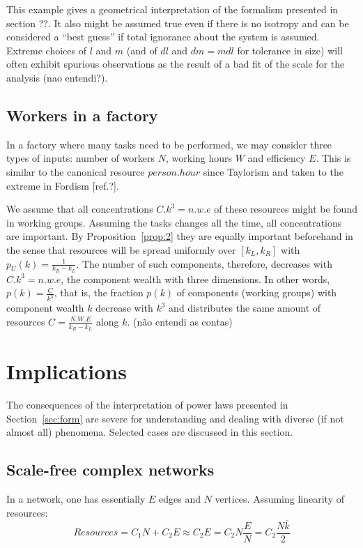 \documentclass[a4paper, 11pt]{article} %
\begin{document}
This example gives a geometrical interpretation of the formalism presented in section ??. It also might be assumed true even if there is no isotropy and can be considered a ``best guess'' if total ignorance
about the system is assumed. Extreme choices of $l$ and $m$ (and of $dl$ and $dm=mdl$ for tolerance in size) will often exhibit spurious observations as the result of a bad fit of the scale for the analysis (nao entendi?).

\subsection{Workers in a factory}
In a factory where many tasks need to be performed, we may consider three types of inputs: number of workers $N$, working hours $W$
and efficiency $E$. This is similar to the canonical resource  
$person.hour$ since Taylorism and taken to the extreme in Fordism [ref.?].

We assume that all concentrations $C.k^3=n.w.e$
of these resources might be found in working groups.
Assuming the tasks changes all the time,
all concentrations are important.
By Proposition~\ref{prop:2} they are equally important beforehand
in the sense that 
resources will be spread uniformly over $[k_L,k_R]$
with $p_U(k)=\frac{1}{k_R-k_L}$.
The number of such components, therefore,
decreases with $C.k^3=n.w.e$, the component wealth with three dimensions.
In other words,
$p(k)=\frac{C}{k^3}$, that is,
the fraction $p(k)$ of components (working groups) with component wealth $k$
decrease with $k^3$ and distributes the same
amount of resources $C=\frac{N.W.E}{k_R-k_L}$ along $k$. (não entendi as contas)


\section{Implications}\label{sec:esp}
The consequences of the interpretation of power laws presented in Section~\ref{sec:form} are severe for understanding and dealing with
diverse (if not almost all) phenomena. Selected cases are discussed in this section.


\subsection{Scale-free complex networks}

In a network, one has essentially $E$ edges and $N$ vertices.
Assuming linearity of resources:
\begin{equation}\label{eq:nre}
	Resources=C_1 N + C_2 E \approx C_2 E = C_2 N \frac{E}{N} = C_2 \frac{N \overline{k}}{2}
\end{equation}
\end{document}
